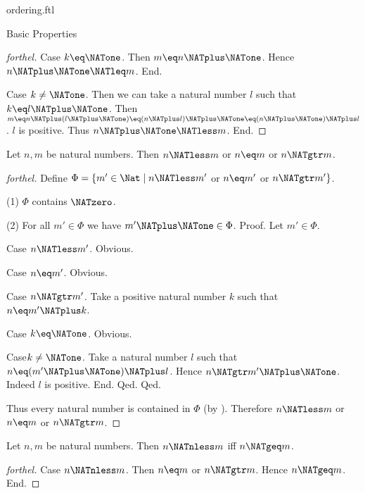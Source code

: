 \documentclass{naproche-library}
\begin{document}
\begin{smodule}[title=The Standard Ordering of the Natural Numbers]{ordering.ftl}
\begin{sfragment}{Basic Properties}
\begin{proof}[forthel]
    Case $k \eq \NATone$.
      Then $m \eq n \NATplus \NATone$.
      Hence $n \NATplus \NATone \NATleq m$.
    End.

    Case $k \neq \NATone$.
      Then we can take a natural number $l$ such that $k \eq l \NATplus \NATone$.
      Then $m
        \eq n \NATplus (l \NATplus \NATone)
        \eq (n \NATplus l) \NATplus \NATone
        \eq (n \NATplus \NATone) \NATplus l$.
      $l$ is positive.
      Thus $n \NATplus \NATone \NATless m$.
    End.
  \end{proof}

  \begin{proposition}[forthel,id=ARITHMETIC_04_8201937860165632]
    Let $n, m$ be natural numbers.
    Then $n \NATless m$ or $n \eq m$ or $n \NATgtr m$.
  \end{proposition}
  \begin{proof}[forthel]
    Define $\Phi = \{ m' \in \Nat \mid n \NATless m'$ or $n \eq m'$ or $n \NATgtr m' \}$.

    (1) $\Phi$ contains $\NATzero$.

    (2) For all $m' \in \Phi$ we have $m' \NATplus \NATone \in \Phi$. \newline
    Proof.
      Let $m' \in \Phi$.

      Case $n \NATless m'$. Obvious.

      Case $n \eq m'$. Obvious.

      Case $n \NATgtr m'$.
        Take a positive natural number $k$ such that $n \eq m' \NATplus k$.

        Case $k \eq \NATone$. Obvious.

        Case$k \neq \NATone$.
          Take a natural number $l$ such that $n \eq (m' \NATplus \NATone) \NATplus l$.
          Hence $n \NATgtr m' \NATplus \NATone$.
          Indeed $l$ is positive.
        End.
      Qed.
    Qed.

    Thus every natural number is contained in $\Phi$ (by ).
    Therefore $n \NATless m$ or $n \eq m$ or $n \NATgtr m$.
  \end{proof}

  \begin{proposition}[forthel,id=ARITHMETIC_04_6991525988794368]
    Let $n, m$ be natural numbers.
    Then $n \NATnless m$ iff $n \NATgeq m$.
  \end{proposition}
  \begin{proof}[forthel]
    Case $n \NATnless m$.
      Then $n \eq m$ or $n \NATgtr m$.
      Hence $n \NATgeq m$.
    End.


\end{proof}
\end{sfragment}
\end{smodule}
\end{document}
